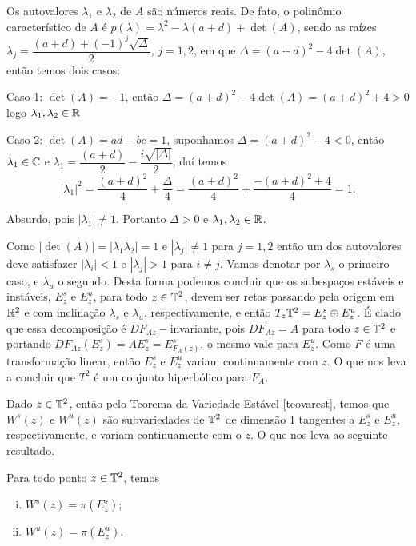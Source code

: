 Os autovalores $\lambda_1$ e $\lambda_2$ de $A$ são números reais. De fato, o polinômio característico de $A$ é $p(\lambda)=\lambda^2-\lambda(a+d)+\det(A)$, sendo as raízes $\lambda_j=\dfrac{(a+d)+(-1)^j\sqrt{\Delta}}{2}$, $j=1,2$, em que $\Delta=(a+d)^2-4\det(A)$, então temos dois casos:

Caso 1: $\det(A)=-1$, então $\Delta=(a+d)^2-4\det(A)=(a+d)^2+4>0$ logo $\lambda_1,\lambda_2\in\mathbb{R}$

Caso 2: $\det(A)=ad-bc=1$, suponhamos $\Delta=(a+d)^2-4<0$, então $\lambda_1\in\mathbb{C}$ e $\lambda_1=\dfrac{(a+d)}{2}-\dfrac{i\sqrt{|\Delta|}}{2}$, daí temos $$|\lambda_1|^2=\dfrac{(a+d)^2}{4}+\dfrac{\Delta}{4}=\dfrac{(a+d)^2}{4}+\dfrac{-(a+d)^2+4}{4}=1.$$

Absurdo, pois $|\lambda_1|\neq 1$. Portanto $\Delta>0$ e $\lambda_1,\lambda_2\in\mathbb{R}$.

Como $|\det(A)|=|\lambda_1\lambda_2|=1$ e $|\lambda_j|\neq1$ para $j=1,2$ então um dos autovalores deve satisfazer $|\lambda_i|<1$ e $|\lambda_j|>1$ para $i\neq j$. Vamos denotar por $\lambda_s$ o primeiro caso, e $\lambda_u$ o segundo. Desta forma podemos concluir que os subespaços estáveis e instáveis, $E^s_z$ e $E^u_z$, para todo $z\in\mathbb{T}^2$, devem ser retas passando pela origem em $\mathbb{R}^2$ e com inclinação $\lambda_s$ e $\lambda_u$, respectivamente, e então $T_z\mathbb{T}^2=E^s_z\oplus E^u_z$. É clado que essa decomposição é $DF_{Az}-$invariante, pois $DF_{Az}=A$ para todo $z\in\mathbb{T}^2$ e portando $DF_{Az}(E^s_z)=AE^s_z=E^s_{F_A(z)}$, o mesmo vale para $E^u_z$. Como $F$ é uma transformação linear, então $E^s_z$ e $E^u_z$ variam continuamente com $z$. O que nos leva a concluir que $T^2$ é um conjunto hiperbólico para $F_A$.

Dado $z\in\mathbb{T}^2$, então pelo Teorema da Variedade Estável \ref{teovarest}, temos que $W^s(z)$ e $W^u(z)$ são subvariedades de $\mathbb{T}^2$ de dimensão 1 tangentes a $E^s_z$ e $E^u_z$, respectivamente, e variam continuamente com o $z$. O que nos leva ao seguinte resultado.

\begin{proposicao} Para todo ponto $z\in\mathbb{T}^2$, temos
\begin{enumerate}[i)]
\item $W^s(z)=\pi(E^s_z)$;
\item $W^u(z)=\pi(E^u_z)$.
\end{enumerate}
\end{proposicao}

